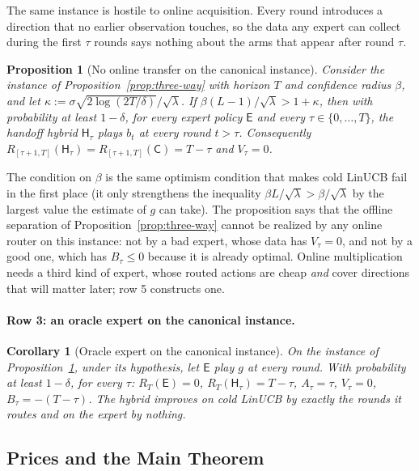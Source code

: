 \documentclass{article}
\newtheorem{proposition}{Proposition}
\newtheorem{corollary}{Corollary}
\theoremstyle{definition}
\theoremstyle{remark}
\theoremstyle{remark}
\newcommand{\Cold}{\mathsf{C}}
\newcommand{\Exp}{\mathsf{E}}
\newcommand{\Hyb}{\mathsf{H}}
\begin{document}
The same instance is hostile to online acquisition. Every round introduces a
direction that no earlier observation touches, so the data any expert can
collect during the first $\tau$ rounds says nothing about the arms that appear
after round $\tau$.

\begin{proposition}[No online transfer on the canonical instance]
\label{prop:one-pass}
Consider the instance of Proposition~\ref{prop:three-way} with horizon $T$
and confidence radius $\beta$, and let $\kappa:=\sigma\sqrt{2\log(2T/\delta)}/\sqrt\lambda$.
If $\beta(L-1)/\sqrt\lambda>1+\kappa$, then with probability at least
$1-\delta$, for \emph{every} expert policy $\Exp$ and every $\tau\in\{0,\dots,T\}$,
the handoff hybrid $\Hyb_\tau$ plays $b_t$ at every round $t>\tau$. Consequently
$R_{[\tau+1,T]}(\Hyb_\tau)=R_{[\tau+1,T]}(\Cold)=T-\tau$ and $V_\tau=0$.
\end{proposition}

The condition on $\beta$ is the same optimism condition that makes cold LinUCB
fail in the first place (it only strengthens the inequality
$\beta L/\sqrt\lambda>\beta/\sqrt\lambda$ by the largest value the estimate of
$g$ can take). The proposition says that the offline separation of
Proposition~\ref{prop:three-way} cannot be realized by any online router on
this instance: not by a bad expert, whose data has $V_\tau=0$, and not by a
good one, which has $B_\tau\le0$ because it is already optimal. Online
multiplication needs a third kind of expert, whose routed actions are cheap
\emph{and} cover directions that will matter later; row 5 constructs one.


\paragraph{Row 3: an oracle expert on the canonical instance.}
\begin{corollary}[Oracle expert on the canonical instance]
\label{cor:cat-oracle}
On the instance of Proposition~\ref{prop:one-pass}, under its hypothesis, let
$\Exp$ play $g$ at every round. With probability at least $1-\delta$, for every
$\tau$: $R_T(\Exp)=0$, $R_T(\Hyb_\tau)=T-\tau$, $A_\tau=\tau$, $V_\tau=0$,
$B_\tau=-(T-\tau)$. The hybrid improves on cold LinUCB by exactly the rounds
it routes and on the expert by nothing.
\end{corollary}


\subsection{Prices and the Main Theorem}
\label{sec:price}
\end{document}
